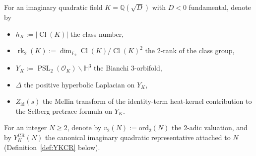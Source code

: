\documentclass[11pt,a4paper,reqno]{amsart}
\theoremstyle{definition}
\DeclareMathOperator{\PSL}{PSL}
\DeclareMathOperator{\Cl}{Cl}
\DeclareMathOperator{\rk}{rk}
\newcommand{\OK}{\mathcal{O}_K}
\newcommand{\HH}{\mathbb{H}}
\newcommand{\QQ}{\mathbb{Q}}
\newcommand{\FF}{\mathbb{F}}
\newcommand{\YK}{Y_K}
\newcommand{\vtwo}{v_2}
\newcommand{\YKCR}{Y_K^{\mathrm{CR}}}
\begin{document}
For an imaginary quadratic field $K=\QQ(\sqrt{D})$ with $D<0$ fundamental,
denote by
\begin{itemize}[leftmargin=2em]
  \item $h_{K} := |\Cl(K)|$ the class number,
  \item $\rk_{2}(K) := \dim_{\FF_{2}}\Cl(K)/\Cl(K)^{2}$ the 2-rank of the
        class group,
  \item $\YK := \PSL_{2}(\OK)\backslash\HH^{3}$ the Bianchi 3-orbifold,
  \item $\Delta$ the positive hyperbolic Laplacian on $\YK$,
  \item $Z_{\mathrm{id}}(s)$ the Mellin transform of the identity-term
        heat-kernel contribution to the Selberg pretrace formula on $\YK$.
\end{itemize}
For an integer $N\ge 2$, denote by $\vtwo(N) := \mathrm{ord}_{2}(N)$ the
2-adic valuation, and by $\YKCR(N)$ the canonical imaginary quadratic
representative attached to $N$ (Definition~\ref{def:YKCR} below).
\end{document}
